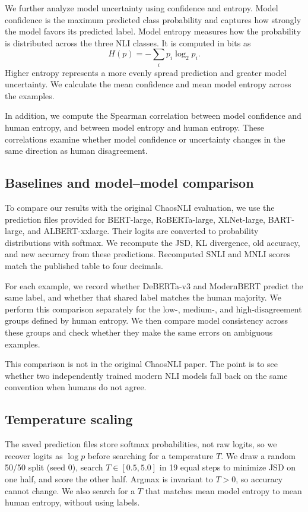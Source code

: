 \documentclass[11pt,a4paper]{article}
\begin{document}
We further analyze model uncertainty using confidence and entropy. Model confidence is the maximum predicted class probability and captures how strongly the model favors its predicted label. Model entropy measures how the probability is distributed across the three NLI classes. It is computed in bits as
\[
H(p)=-\sum_i p_i\log_2 p_i.
\]
Higher entropy represents a more evenly spread prediction and greater model uncertainty. We calculate the mean confidence and mean model entropy across the examples.

In addition, we compute the Spearman correlation between model confidence and human entropy, and between model entropy and human entropy. These correlations examine whether model confidence or uncertainty changes in the same direction as human disagreement.

\subsection{Baselines and model--model comparison}

To compare our results with the original ChaosNLI evaluation, we use the prediction files provided for BERT-large, RoBERTa-large, XLNet-large, BART-large, and ALBERT-xxlarge. Their logits are converted to probability distributions with softmax. We recompute the JSD, KL divergence, old accuracy, and new accuracy from these predictions. Recomputed SNLI and MNLI scores match the published table to four decimals.

For each example, we record whether DeBERTa-v3 and ModernBERT predict the same label, and whether that shared label matches the human majority. We perform this comparison separately for the low-, medium-, and high-disagreement groups defined by human entropy. We then compare model consistency across these groups and check whether they make the same errors on ambiguous examples.

This comparison is not in the original ChaosNLI paper. The point is to see whether two independently trained modern NLI models fall back on the same convention when humans do not agree.

\subsection{Temperature scaling}

The saved prediction files store softmax probabilities, not raw logits, so we recover logits as $\log p$ before searching for a temperature $T$. We draw a random 50/50 split (seed 0), search $T \in [0.5, 5.0]$ in 19 equal steps to minimize JSD on one half, and score the other half. Argmax is invariant to $T>0$, so accuracy cannot change. We also search for a $T$ that matches mean model entropy to mean human entropy, without using labels.
\end{document}
